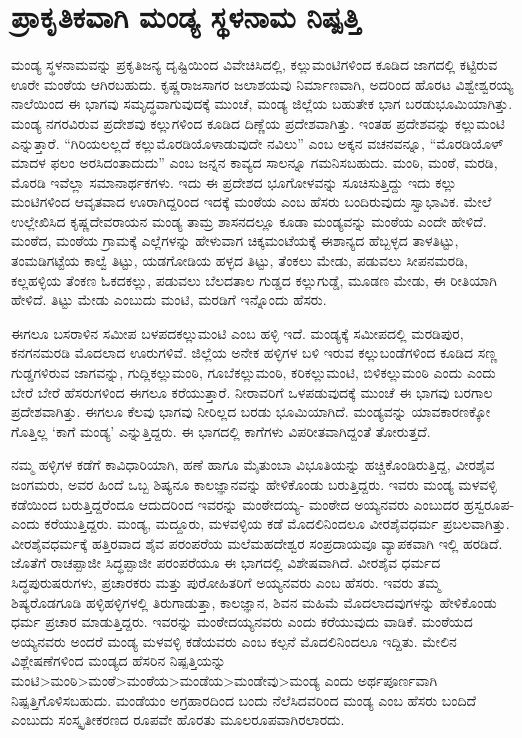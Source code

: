 \section*{ಪ್ರಾಕೃತಿಕವಾಗಿ ಮಂಡ್ಯ ಸ್ಥಳನಾಮ ನಿಷ್ಪತ್ತಿ}

ಮಂಡ್ಯ ಸ್ಥಳನಾಮವನ್ನು ಪ್ರಕೃತಿಜನ್ಯ ದೃಷ್ಟಿಯಿಂದ ವಿವೇಚಿಸಿದಲ್ಲಿ, ಕಲ್ಲುಮಂಟಿಗಳಿಂದ ಕೂಡಿದ ಜಾಗದಲ್ಲಿ ಕಟ್ಟಿರುವ ಊರೇ ಮಂಠೆಯ ಆಗಿರಬಹುದು. ಕೃಷ್ಣರಾಜಸಾಗರ ಜಲಾಶಯವು ನಿರ್ಮಾಣವಾಗಿ, ಅದರಿಂದ ಹೊರಟ ವಿಶ್ವೇಶ್ವರಯ್ಯ ನಾಲೆಯಿಂದ ಈ ಭಾಗವು ಸಮೃದ್ಧವಾಗುವುದಕ್ಕೆ ಮುಂಚೆ, ಮಂಡ್ಯ ಜಿಲ್ಲೆಯ ಬಹುತೇಕ ಭಾಗ ಬರಡುಭೂಮಿಯಾಗಿತ್ತು. ಮಂಡ್ಯ ನಗರವಿರುವ ಪ್ರದೇಶವು ಕಲ್ಲುಗಳಿಂದ ಕೂಡಿದ ದಿಣ್ಣೆಯ ಪ್ರದೇಶವಾಗಿತ್ತು. ಇಂತಹ ಪ್ರದೇಶವನ್ನು ಕಲ್ಲುಮಂಟಿ ಎನ್ನುತ್ತಾರೆ. “ಗಿರಿಯಲಲ್ಲದೆ ಕಲ್ಲುಮೊರಡಿಯೊಳಾಡುವುದೇ ನವಿಲು” ಎಂಬ ಅಕ್ಕನ ವಚನವನ್ನೂ, “ಮೊರಡಿಯೊಳ್​ ಮಾದಳ ಫಲಂ ಅರಸಿದಂತಾದುದು” ಎಂಬ ಜನ್ನನ ಕಾವ್ಯದ ಸಾಲನ್ನೂ ಗಮನಿಸಬಹುದು. ಮಂಠಿ, ಮಂಠೆ, ಮರಡಿ, ಮೊರಡಿ ಇವೆಲ್ಲಾ ಸಮಾನಾರ್ಥಕಗಳು. ಇದು ಈ ಪ್ರದೇಶದ ಭೂಗೋಳವನ್ನು ಸೂಚಿಸುತ್ತಿದ್ದು ಇದು ಕಲ್ಲು ಮಂಟಿಗಳಿಂದ ಆವೃತವಾದ ಊರಾಗಿದ್ದರಿಂದ ಇದಕ್ಕೆ ಮಂಠೆಯ ಎಂಬ ಹೆಸರು ಬಂದಿರುವುದು ಸ್ವಾಭಾವಿಕ. ಮೇಲೆ ಉಲ್ಲೇಖಿಸಿದ ಕೃಷ್ಣದೇವರಾಯನ ಮಂಡ್ಯ ತಾಮ್ರ ಶಾಸನದಲ್ಲೂ ಕೂಡಾ ಮಂಡ್ಯವನ್ನು ಮಂಠೆಯ ಎಂದೇ ಹೇಳಿದೆ. ಮಂಠೆದ, ಮಂಠೆಯ ಗ್ರಾಮಕ್ಕೆ ಎಲ್ಲೆಗಳನ್ನು ಹೇಳುವಾಗ ಚಿಕ್ಕಮಂಟೆಯಕ್ಕೆ ಈಶಾನ್ಯದ ಹೆಬ್ಬಳ್ಳದ ತಾಳತಿಟ್ಟು, ತಂಮಡಿಗಟ್ಟೆಯ ಕಾಲ್ವೆ ತಿಟ್ಟು, ಯಡಗೋಡಿಯ ಹಳ್ಳದ ತಿಟ್ಟು, ತೆಂಕಲು ಮೇಡು, ಪಡುವಲು ಸೀಪನಮರಡಿ, ಕಲ್ಲಹಳ್ಳಿಯ ತೆಂಕಣ ಓಕದಕಲ್ಲು, ಪಡುವಲು ಬೆಲದತಾಲ ಗುಡ್ಡದ ಕಲ್ಲುಗುಡ್ಡೆ, ಮೂಡಣ ಮೇಡು, ಈ ರೀತಿಯಾಗಿ ಹೇಳಿದೆ. ತಿಟ್ಟು ಮೇಡು ಎಂಬುದು ಮಂಟಿ, ಮರಡಿಗೆ ಇನ್ನೊಂದು ಹೆಸರು.

ಈಗಲೂ ಬಸರಾಳಿನ ಸಮೀಪ ಬಳಪದಕಲ್ಲುಮಂಟಿ ಎಂಬ ಹಳ್ಳಿ ಇದೆ. ಮಂಡ್ಯಕ್ಕೆ ಸಮೀಪದಲ್ಲಿ ಮರಡಿಪುರ, ಕನಗನಮರಡಿ ಮೊದಲಾದ ಊರುಗಳಿವೆ. ಜಿಲ್ಲೆಯ ಅನೇಕ ಹಳ್ಳಿಗಳ ಬಳಿ ಇರುವ ಕಲ್ಲುಬಂಡೆಗಳಿಂದ ಕೂಡಿದ ಸಣ್ಣ ಗುಡ್ಡಗಳಿರುವ ಜಾಗವನ್ನು, ಗುದ್ಲಿಕಲ್ಲುಮಂಠಿ, ಗೂಬೆಕಲ್ಲುಮಂಠಿ, ಕರಿಕಲ್ಲುಮಂಟಿ, ಬಿಳಿಕಲ್ಲುಮಂಠಿ ಎಂದು ಎಂದು ಬೇರೆ ಬೇರೆ ಹೆಸರುಗಳಿಂದ ಈಗಲೂ ಕರೆಯುತ್ತಾರೆ. ನೀರಾವರಿಗೆ ಒಳಪಡುವುದಕ್ಕೆ ಮುಂಚೆ ಈ ಭಾಗವು ಬರಗಾಲ ಪ್ರದೇಶವಾಗಿತ್ತು. ಈಗಲೂ ಕೆಲವು ಭಾಗವು ನೀರಿಲ್ಲದ ಬರಡು ಭೂಮಿಯಾಗಿದೆ. ಮಂಡ್ಯವನ್ನು ಯಾವಕಾರಣಕ್ಕೋ ಗೊತ್ತಿಲ್ಲ ‘ಕಾಗೆ ಮಂಡ್ಯ’ ಎನ್ನುತ್ತಿದ್ದರು. ಈ ಭಾಗದಲ್ಲಿ ಕಾಗೆಗಳು ವಿಪರೀತವಾಗಿದ್ದಂತೆ ತೋರುತ್ತದೆ.

ನಮ್ಮ ಹಳ್ಳಿಗಳ ಕಡೆಗೆ ಕಾವಿಧಾರಿಯಾಗಿ, ಹಣೆ ಹಾಗೂ ಮೈತುಂಬಾ ವಿಭೂತಿಯನ್ನು ಹಚ್ಚಿಕೊಂಡಿರುತ್ತಿದ್ದ, ವೀರಶೈವ ಜಂಗಮರು, ಅವರ ಹಿಂದೆ ಒಬ್ಬ ಶಿಷ್ಯನೂ ಕಾಲಜ್ಞಾನವನ್ನು ಹೇಳಿಕೊಂಡು ಬರುತ್ತಿದ್ದರು. ಇವರು ಮಂಡ್ಯ ಮಳವಳ್ಳಿ ಕಡೆಯಿಂದ ಬರುತ್ತಿದ್ದರೆಂದೂ ಆದುದರಿಂದ ಇವರನ್ನು ಮಂಠೇದಯ್ಯ- ಮಂಠೇದ ಅಯ್ಯನವರು ಎಂಬುದರ ಹ್ರಸ್ವರೂಪ- ಎಂದು ಕರೆಯುತ್ತಿದ್ದರು. ಮಂಡ್ಯ, ಮದ್ದೂರು, ಮಳವಳ್ಳಿಯ ಕಡೆ ಮೊದಲಿನಿಂದಲೂ ವೀರಶೈವಧರ್ಮ ಪ್ರಬಲವಾಗಿತ್ತು. ವೀರಶೈವಧರ್ಮಕ್ಕೆ ಹತ್ತಿರವಾದ ಶೈವ ಪರಂಪರೆಯ ಮಲೆಮಹದೇಶ್ವರ ಸಂಪ್ರದಾಯವೂ ವ್ಯಾಪಕವಾಗಿ ಇಲ್ಲಿ ಹರಡಿದೆ. ಜೊತೆಗೆ ರಾಚಪ್ಪಾಜೀ ಸಿದ್ಧಪ್ಪಾಜೀ ಪರಂಪರೆಯೂ ಈ ಭಾಗದಲ್ಲಿ ವಿಶೇಷವಾಗಿದೆ. ವೀರಶೈವ ಧರ್ಮದ ಸಿದ್ಧಪುರುಷರುಗಳು, ಪ್ರಚಾರಕರು ಮತ್ತು ಪುರೋಹಿತರಿಗೆ ಅಯ್ಯನವರು ಎಂಬ ಹೆಸರು. ಇವರು ತಮ್ಮ ಶಿಷ್ಯರೊಡಗೂಡಿ ಹಳ್ಳಿಹಳ್ಳಿಗಳಲ್ಲಿ ತಿರುಗಾಡುತ್ತಾ, ಕಾಲಜ್ಞಾನ, ಶಿವನ ಮಹಿಮೆ ಮೊದಲಾದವುಗಳನ್ನು ಹೇಳಿಕೊಂಡು ಧರ್ಮ ಪ್ರಚಾರ ಮಾಡುತ್ತಿದ್ದರು. ಇವರನ್ನು ಮಂಠೇದಯ್ಯನವರು ಎಂದು ಕರೆಯುವುದು ವಾಡಿಕೆ. ಮಂಠೆಯದ ಅಯ್ಯನವರು ಅಂದರೆ ಮಂಡ್ಯ ಮಳವಳ್ಳಿ ಕಡೆಯವರು ಎಂಬ ಕಲ್ಪನೆ ಮೊದಲಿನಿಂದಲೂ ಇದ್ದಿತು. ಮೇಲಿನ ವಿಶ್ಲೇಷಣೆಗಳಿಂದ ಮಂಡ್ಯದ ಹೆಸರಿನ ನಿಷ್ಪತ್ತಿಯನ್ನು ಮಂಟಿ\textgreater  ಮಂಠಿ\textgreater  ಮಂಠೆ\textgreater  ಮಂಠೆಯ\textgreater  ಮಂಡೆಯ\textgreater  ಮಂಡೇವು\textgreater ಮಂಡ್ಯ ಎಂದು ಅರ್ಥಪೂರ್ಣವಾಗಿ ನಿಷ್ಪತ್ತಿಗೊಳಿಸಬಹುದು. ಮಂಡೆಯಂ ಅಗ್ರಹಾರದಿಂದ ಬಂದು ನೆಲೆಸಿದವರಿಂದ ಮಂಡ್ಯ ಎಂಬ ಹೆಸರು ಬಂದಿದೆ ಎಂಬುದು ಸಂಸ್ಕೃತೀಕರಣದ ರೂಪವೇ ಹೊರತು ಮೂಲರೂಪವಾಗಿರಲಾರದು.


